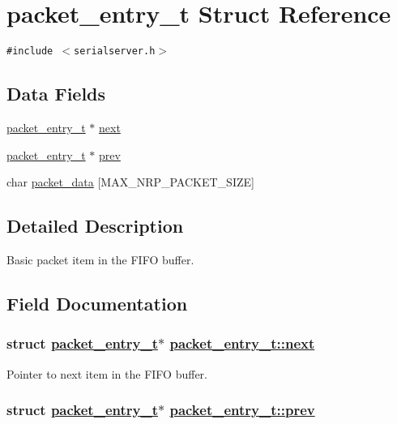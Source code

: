 \hypertarget{structpacket__entry__t}{
\section{packet\_\-entry\_\-t Struct Reference}
\label{structpacket__entry__t}
}
{\tt \#include $<$serialserver.h$>$}

\subsection*{Data Fields}
\begin{CompactItemize}
\item 
\hyperlink{structpacket__entry__t}{packet\_\-entry\_\-t} $\ast$ \hyperlink{structpacket__entry__t_3fe6dc267e444e95acf382b9844cecaf}{next}
\item 
\hyperlink{structpacket__entry__t}{packet\_\-entry\_\-t} $\ast$ \hyperlink{structpacket__entry__t_bf2385bedd4ae2af115b923f29c8ec5d}{prev}
\item 
char \hyperlink{structpacket__entry__t_a4ed47e0ce37602056f98befd3340a42}{packet\_\-data} \mbox{[}MAX\_\-NRP\_\-PACKET\_\-SIZE\mbox{]}
\end{CompactItemize}


\subsection{Detailed Description}
Basic packet item in the FIFO buffer. 



\subsection{Field Documentation}
\hypertarget{structpacket__entry__t_3fe6dc267e444e95acf382b9844cecaf}{
\subsubsection[next]{\setlength{\rightskip}{0pt plus 5cm}struct \hyperlink{structpacket__entry__t}{packet\_\-entry\_\-t}$\ast$ \hyperlink{structpacket__entry__t_3fe6dc267e444e95acf382b9844cecaf}{packet\_\-entry\_\-t::next}}}
\label{structpacket__entry__t_3fe6dc267e444e95acf382b9844cecaf}


Pointer to next item in the FIFO buffer. \hypertarget{structpacket__entry__t_bf2385bedd4ae2af115b923f29c8ec5d}{
\subsubsection[prev]{\setlength{\rightskip}{0pt plus 5cm}struct \hyperlink{structpacket__entry__t}{packet\_\-entry\_\-t}$\ast$ \hyperlink{structpacket__entry__t_bf2385bedd4ae2af115b923f29c8ec5d}{packet\_\-entry\_\-t::prev}}}
\label{structpacket__entry__t_bf2385bedd4ae2af115b923f29c8ec5d}


